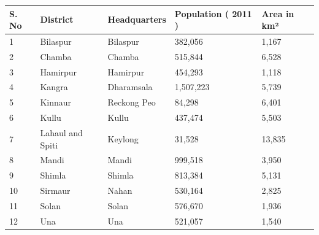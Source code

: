 \documentclass{article}
\begin{document}
\begin{tabular}{lllll}
\toprule
S. No & District & Headquarters & Population ( 2011 ) & Area in km² \\
\midrule
1 & Bilaspur & Bilaspur & 382,056 & 1,167 \\
2 & Chamba & Chamba & 515,844 & 6,528 \\
3 & Hamirpur & Hamirpur & 454,293 & 1,118 \\
4 & Kangra & Dharamsala & 1,507,223 & 5,739 \\
5 & Kinnaur & Reckong Peo & 84,298 & 6,401 \\
6 & Kullu & Kullu & 437,474 & 5,503 \\
7 & Lahaul and Spiti & Keylong & 31,528 & 13,835 \\
8 & Mandi & Mandi & 999,518 & 3,950 \\
9 & Shimla & Shimla & 813,384 & 5,131 \\
10 & Sirmaur & Nahan & 530,164 & 2,825 \\
11 & Solan & Solan & 576,670 & 1,936 \\
12 & Una & Una & 521,057 & 1,540 \\
\bottomrule
\end{tabular}
\end{document}
